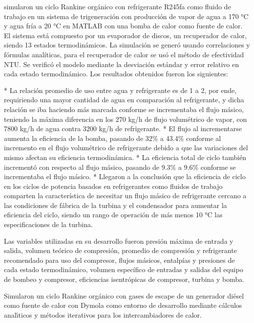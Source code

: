 \textcite{MORADI201866} simularon un ciclo Rankine orgánico  con refrigerante R245fa como fluido de trabajo en un sistema de trigeneración con producción de vapor de agua a 170 °C y agua fría a 20 °C en MATLAB con una bomba de calor como fuente de calor. El sistema está compuesto por un evaporador de discos, un recuperador de calor, siendo 13 estados termodinámicos. La simulación se generó usando  correlaciones y fórmulas analíticas, para el recuperador de calor se usó el método de efectividad NTU. Se verificó el modelo mediante la desviación estándar y error relativo en cada estado termodinámico. Los resultados obtenidos fueron los siguientes:

\begin{markdown}
* La relación promedio de uso entre agua y refrigerante es de 1 a 2, por ende, requiriendo una mayor cantidad de agua en comparación al refrigerante, y dicha relación se iba haciendo más marcada conforme se incrementaba el flujo másico, teniendo la máxima diferencia en los 270 kg/h de flujo volumétrico de vapor, con 7800 kg/h de agua contra 3200 kg/h de refrigerante.
* El flujo al incrementarse aumenta la eficiencia de la bomba, pasando de 32\% a 43.4\% conforme al incremento en el flujo volumétrico de refrigerante debido a que las variaciones del mismo afectan su eficiencia termodinámica.
* La eficiencia total de ciclo también incrementó con respecto al flujo másico, pasando de 9.3\% a 9.6\% conforme se incrementaba el flujo másico.
* Llegaron a la conclusión que la eficiencia de ciclo en los ciclos de potencia basados en refrigerantes como fluidos de trabajo comparten la característica de necesitar un flujo másico de refrigerante cercano a las condiciones de fábrica de la turbina y el condensador para aumentar la eficiencia del ciclo, siendo un rango de operación de más menos 10 °C las especificaciones de la turbina.
\end{markdown}

Las variables utilizadas en su desarrollo fueron presión máxima de entrada y salida, volumen teórico de compresión, promedio de compresión y refrigerante recomendado para uso del compresor, flujos másicos, entalpías y presiones de cada estado termodinámico, volumen específico de entradas y salidas del equipo de bombeo y compresor, eficiencias isentrópicas de compresor, turbina y bomba.

\textcite{NI20171274} Simularon un ciclo Rankine orgánico con gases de escape de un generador diésel como fuente de calor con Dymola como entorno de desarrollo mediante cálculos analı́ticos y métodos iterativos para los intercambiadores de calor.


